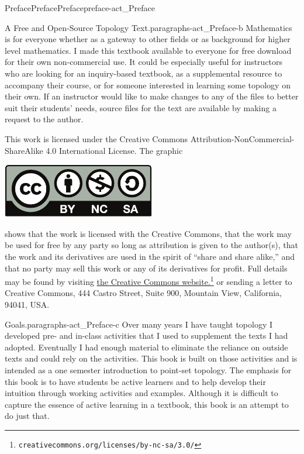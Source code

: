 \documentclass[oneside,10pt,]{book}
\numberwithin{equation}{chapter}
\begin{document}
\begin{preface}{Preface}{Preface}{}{Preface}{}{}{preface-act_Preface}
\begin{paragraphs}{A Free and Open-Source Topology Text.}{paragraphs-act_Preface-b}%
Mathematics is for everyone \textemdash{} whether as a gateway to other fields or as background for higher level mathematics. I made this textbook available to everyone for free download for their own non-commercial use. It could be especially useful for instructors who are looking for an inquiry-based textbook, as a supplemental resource to accompany their course, or for someone interested in learning some topology on their own. If an instructor would like to make changes to any of the files to better suit their students' needs, source files for the text are available by making a request to the author.%
\par
This work is licensed under the Creative Commons Attribution-NonCommercial-ShareAlike 4.0 International License. The graphic%
\begin{image}{0.3}{0.4}{0.3}{}%
\includegraphics[width=\linewidth]{external/cc_by_nc_sa.pdf}
\end{image}%
shows that the work is licensed with the Creative Commons, that the work may be used for free by any party so long as attribution is given to the author(s), that the work and its derivatives are used in the spirit of ``share and share alike,'' and that no party may sell this work or any of its derivatives for profit. Full details may be found by visiting \href{http://creativecommons.org/licenses/by-nc-sa/3.0/}{the Creative Commons website.}\footnote{\nolinkurl{creativecommons.org/licenses/by-nc-sa/3.0/}\label{fn-act_Preface-b-e-c}} or sending a letter to Creative Commons, 444 Castro Street, Suite 900, Mountain View, California, 94041, USA.%
\end{paragraphs}%
\begin{paragraphs}{Goals.}{paragraphs-act_Preface-c}%
Over many years I have taught topology I developed pre- and in-class activities that I used to supplement the texts I had adopted. Eventually I had enough material to eliminate the reliance on outside texts and could rely on the activities. This book is built on those activities and is intended as a one semester introduction to point-set topology. The emphasis for this book is to have students be active learners and to help develop their intuition through working activities and examples. Although it is difficult to capture the essence of active learning in a textbook, this book is an attempt to do just that.%

\end{paragraphs}
\end{preface}
\end{document}
